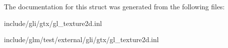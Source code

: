\-The documentation for this struct was generated from the following files\-:\begin{DoxyCompactItemize}
\item 
include/gli/gtx/gl\-\_\-texture2d.\-inl\item 
include/glm/test/external/gli/gtx/gl\-\_\-texture2d.\-inl\end{DoxyCompactItemize}
